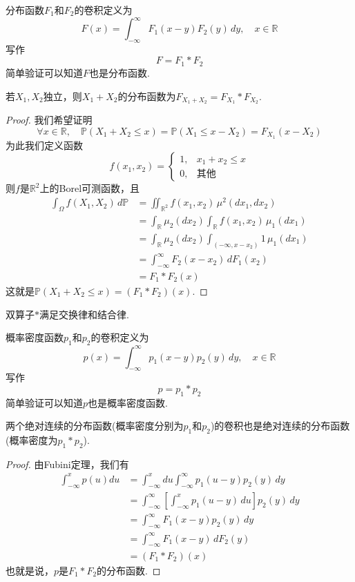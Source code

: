 分布函数$F_1$和$F_2$的卷积定义为
$$
    F(x)=\int_{-\infty}^{\infty} F_1(x-y)F_2(y) \, dy,\quad x\in\mathbb{R}
$$
写作
$$
    F=F_1*F_2
$$
简单验证可以知道$F$也是分布函数.
\begin{theorem}
    若$X_1,X_2$独立，则$X_1+X_2$的分布函数为$F_{X_1+X_2}=F_{X_1}*F_{X_2}$.
\end{theorem}
\begin{proof}
    我们希望证明
    \[\forall x\in\mathbb{R}, \quad \mathbb{P}(X_1+X_2\le x)=\mathbb{P}(X_1\le x-X_2)=F_{X_1}(x-X_2)\]
    为此我们定义函数
    \[f(x_1,x_2)=\begin{cases}
            1, & x_1+x_2\le x \\
            0, & \text{其他}
        \end{cases}\]
    则$f$是$\mathbb{R}^2$上的Borel可测函数，且
    \begin{align*}
        \int_\Omega f(X_1,X_2) \, d\mathbb{P} & =\iint_{\mathbb{R}^2} f(x_1,x_2) \, \mu^2(dx_1,dx_2)                    \\
                                              & =\int_{\mathbb{R}}\mu_2(dx_2)\int_{\mathbb{R}}f(x_1,x_2) \, \mu_1(dx_1) \\
                                              & =\int_{\mathbb{R}}\mu_2(dx_2)\int_{(-\infty,x-x_2)}1 \, \mu_1(dx_1)     \\
                                              & =\int_{-\infty}^{\infty}F_2(x-x_2) \, dF_1(x_2)                         \\
                                              & =F_1*F_2(x)
    \end{align*}
    这就是$\mathbb{P}(X_1+X_2\le x)=(F_1*F_2)(x)$.
\end{proof}
\begin{corollary}
    双算子$*$满足交换律和结合律.
\end{corollary}
概率密度函数$p_1$和$p_2$的卷积定义为
$$
    p(x)=\int_{-\infty}^{\infty} p_1(x-y)p_2(y) \, dy,\quad x\in\mathbb{R}
$$
写作
$$
    p=p_1*p_2
$$
简单验证可以知道$p$也是概率密度函数.
\begin{theorem}
    两个绝对连续的分布函数(概率密度分别为$p_1$和$p_2$)的卷积也是绝对连续的分布函数(概率密度为$p_1*p_2$).
\end{theorem}
\begin{proof}
    由Fubini定理，我们有
    \begin{align*}
        \int_{-\infty}^x p(u)du & =\int_{-\infty}^x du \int_{-\infty}^{\infty} p_1(u-y)p_2(y) \, dy                   \\
                                & = \int_{-\infty}^{\infty}\left[\int_{-\infty}^{x} p_1(u-y) \, du\right]p_2(y) \, dy \\
                                & = \int_{-\infty}^{\infty} F_1(x-y)p_2(y) \, dy                                      \\
                                & = \int_{-\infty}^{\infty} F_1(x-y) \, dF_2(y)                                       \\
                                & = (F_1*F_2)(x)
    \end{align*}
    也就是说，$p$是$F_1*F_2$的分布函数.
\end{proof}

